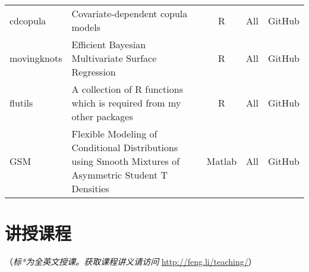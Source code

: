 \documentclass[twoside,a4paper,11pt]{article}
\begin{document}
\begin{center}
\begin{tabular}{lp{9cm}ccl}
cdcopula    & Covariate-dependent copula models                                                                                    & R        & All         & GitHub       \\
movingknots & Efficient Bayesian Multivariate Surface Regression                                                                   & R        & All         & GitHub       \\
flutils     & A collection of R functions which is required from my other packages                                                 & R        & All         & GitHub       \\
GSM         & Flexible Modeling of Conditional Distributions using Smooth Mixtures of Asymmetric Student T Densities               & Matlab   & All         & GitHub       \\
  \bottomrule
\end{tabular}
\end{center}


\newpage
\section{讲授课程}
（\emph{标*为全英文授课。获取课程讲义请访问} \url{http://feng.li/teaching/}）
\end{document}
